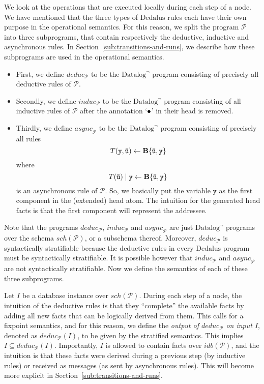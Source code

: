 \documentclass{tlp}
\newcommand{\langname}[1]{\text{#1}}  \newcommand{\pred}[1]{\mathtt{#1}}  \newcommand{\fname}[1]{\mathit{#1}}  \newcommand{\sq}[1]{`{#1}'}
\newcommand{\dedalus}{\langname{Dedalus}}
\newcommand{\datalogneg}{\langname{Datalog}^{\neg}}
\newcommand{\ded}{\mathcal{P}}
\newcommand{\idb}[1]{\fname{idb}(#1)}
\newcommand{\schof}[1]{\fname{sch}(#1)}
\newcommand{\var}[1]{\mathtt{#1}}
\newcommand{\tvar}[1]{\mathtt{\bar{#1}}}
\newcommand{\deduc}[1]{\fname{deduc}_{#1}}
\newcommand{\induc}[1]{\fname{induc}_{#1}}
\newcommand{\async}[1]{\fname{async}_{#1}}
\begin{document}
We look at the operations that are executed locally during each step
of a node. We have mentioned that the three types of $\dedalus$ rules
each have their own purpose in the operational semantics. For this
reason, we split the program $\ded$ into three subprograms, that
contain respectively the deductive, inductive and asynchronous rules.
In Section~\ref{sub:transitions-and-runs}, we describe how these
subprograms are used in the operational semantics.
\begin{itemize}
\item First, we define $\deduc{\ded}$ to be the $\datalogneg$ program
consisting of precisely all deductive rules of $\ded$. 
\item Secondly, we define $\induc{\ded}$ to be the $\datalogneg$ program
consisting of all inductive rules of $\ded$ after the annotation
\sq{$\bullet$} in their head is removed. 
\item Thirdly, we define $\async{\ded}$ to be the $\datalogneg$ program
consisting of precisely all rules
\[
T(\var y,\tvar u)\gets\simplebody{\tvar u,\var y}
\]
where 
\[
T(\tvar u)\sugas{\var y}\gets\simplebody{\tvar u,\var y}
\]
is an asynchronous rule of $\ded$. So, we basically put the variable
$\var y$ as the first component in the (extended) head atom. The
intuition for the generated head facts is that the first component
will represent the addressee. 
\end{itemize}
Note that the programs $\deduc{\ded}$, $\induc{\ded}$ and $\async{\ded}$
are just $\datalogneg$ programs over the schema $\schof{\ded}$,
or a subschema thereof. Moreover, $\deduc{\ded}$ is syntactically
stratifiable because the deductive rules in every $\dedalus$ program
must be syntactically stratifiable. It is possible however that $\induc{\ded}$
and $\async{\ded}$ are not syntactically stratifiable. Now we define
the semantics of each of these three subprograms.

Let $I$ be a database instance over $\schof{\ded}$. During each
step of a node, the intuition of the deductive rules is that they
``complete'' the available facts by adding all new facts that can
be logically derived from them. This calls for a fixpoint semantics,
and for this reason, we define the \emph{output of $\deduc{\ded}$
on input $I$}, denoted as $\deduc{\ded}(I)$, to be given by the
stratified semantics. This implies $I\subseteq\deduc{\ded}(I)$. Importantly,
$I$ is allowed to contain facts over $\idb{\ded}$, and the intuition
is that these facts were derived during a previous step (by inductive
rules) or received as messages (as sent by asynchronous rules). This
will become more explicit in Section~\ref{sub:transitions-and-runs}.
\end{document}
